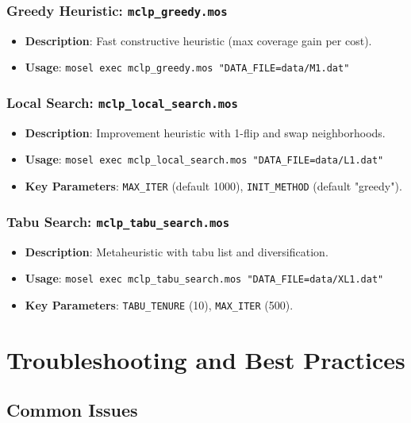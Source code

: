 \documentclass[11pt,a4paper]{article}
\begin{document}
\subsubsection{Greedy Heuristic: \texttt{mclp\_greedy.mos}}
\begin{itemize}
  \item \textbf{Description}: Fast constructive heuristic (max coverage gain per cost).
  \item \textbf{Usage}: \texttt{mosel exec mclp\_greedy.mos "DATA\_FILE=data/M1.dat"}
\end{itemize}

\subsubsection{Local Search: \texttt{mclp\_local\_search.mos}}
\begin{itemize}
  \item \textbf{Description}: Improvement heuristic with 1-flip and swap neighborhoods.
  \item \textbf{Usage}: \texttt{mosel exec mclp\_local\_search.mos "DATA\_FILE=data/L1.dat"}
  \item \textbf{Key Parameters}: \texttt{MAX\_ITER} (default 1000), \texttt{INIT\_METHOD} (default "greedy").
\end{itemize}

\subsubsection{Tabu Search: \texttt{mclp\_tabu\_search.mos}}
\begin{itemize}
  \item \textbf{Description}: Metaheuristic with tabu list and diversification.
  \item \textbf{Usage}: \texttt{mosel exec mclp\_tabu\_search.mos "DATA\_FILE=data/XL1.dat"}
  \item \textbf{Key Parameters}: \texttt{TABU\_TENURE} (10), \texttt{MAX\_ITER} (500).
\end{itemize}

\section{Troubleshooting and Best Practices}

\subsection{Common Issues}
\end{document}
